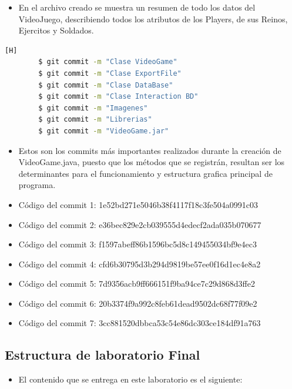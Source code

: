 \documentclass{article}
\begin{document}
	\begin{itemize}
		\item En el archivo creado se muestra un resumen de todo los datos del VideoJuego, describiendo todos los atributos de los Players, de sus Reinos, Ejercitos y Soldados.
	\end{itemize}
 

	
	\begin{lstlisting}[language=bash,caption={Commits del archivo VideoGame.java}][H]
		$ git commit -m "Clase VideoGame"
		$ git commit -m "Clase ExportFile"
		$ git commit -m "Clase DataBase"
		$ git commit -m "Clase Interaction BD"  
		$ git commit -m "Imagenes"
		$ git commit -m "Librerias"
		$ git commit -m "VideoGame.jar"
	\end{lstlisting}
	
	\begin{itemize}
		\item Estos son los commits más importantes realizados durante la creación de VideoGame.java, puesto que los métodos que se registrán, resultan ser los determinantes para el funcionamiento y estructura grafica principal de programa.
		\item Código del commit 1: 1e52bd271e5046b38f4117f18c3fe504a0991c03
		\item Código del commit 2: e36bec829e2cb039555d4edecf2ada035b070677
		\item Código del commit 3: f1597abeff86b1596bc5d8c149455034bf9e4ec3
		\item Código del commit 4: cfd6b30795d3b294d9819be57ee0f16d1ec4e8a2
		\item Código del commit 5: 7d9356acb9ff666151f9ba94ce7c29d868d3ffe2
		\item Código del commit 6: 20b3374f9a992c8feb61dead9502dc68f77f09e2
		\item Código del commit 7: 3cc881520dbbca53c54e86dc303ce184df91a763
        
	\end{itemize}
	

\newpage
	\subsection{Estructura de laboratorio Final}
	\begin{itemize}	
		\item El contenido que se entrega en este laboratorio es el siguiente:
	\end{itemize}
	
\end{document}
